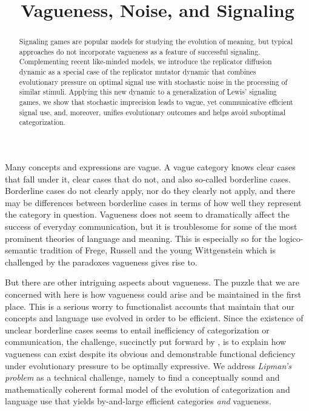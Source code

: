 \documentclass[fleqn,reqno,10pt]{article}
\title{Vagueness, Noise, and Signaling}
\date{}
\begin{document}
\maketitle

\begin{abstract}
  Signaling games are popular models for studying the evolution of
  meaning, but typical approaches do not incorporate vagueness as a
  feature of successful signaling.  Complementing recent like-minded
  models, we introduce the replicator diffusion dynamic as a special
  case of the replicator mutator dynamic that combines evolutionary
  pressure on optimal signal use with stochastic noise in the
  processing of similar stimuli. Applying this new dynamic to a
  generalization of Lewis' signaling games, we show that stochastic
  imprecision leads to vague, yet communicative efficient signal use,
  and, moreover, unifies evolutionary outcomes and helps avoid
  suboptimal categorization.
\end{abstract}

Many concepts and expressions are vague. A vague category knows clear
cases that fall under it, clear cases that do not, and also so-called
borderline cases. Borderline cases do not clearly apply, nor do they
clearly not apply, and there may be differences between borderline
cases in terms of how well they represent the category in
question. Vagueness does not seem to dramatically affect the success
of everyday communication, but it is troublesome for some of the most
prominent theories of language and meaning. This is especially so for the logico-semantic tradition of Frege, Russell and the young
Wittgenstein which is challenged by the paradoxes vagueness gives rise
to. 

But there are other intriguing aspects about vagueness. The puzzle
that we are concerned with here is how vagueness could arise and be
maintained in the first place. This is a serious worry to
functionalist accounts that maintain that our concepts and language
use evolved in order to be efficient. Since the existence of unclear
borderline cases seems to entail inefficiency of categorization or
communication, the challenge, succinctly put forward by
\citet{Lipman2009:Why-is-Language}, is to explain how vagueness can
exist despite its obvious and demonstrable functional deficiency under
evolutionary pressure to be optimally expressive. We address
\emph{Lipman's problem} as a technical challenge, namely to find a
conceptually sound and mathematically coherent formal model of the
evolution of categorization and language use that yields by-and-large
efficient categories \emph{and} vagueness.
\end{document}
